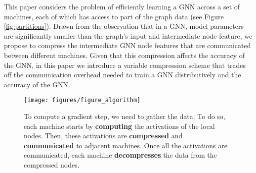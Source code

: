 \documentclass[lettersize,journal]{IEEEtran}
\begin{document}
This paper considers the problem of efficiently learning a GNN across a set of machines, each of which has access to part of the graph data (see Figure \ref{fig:partitions}). Drawn from the observation that in a GNN, model parameters are significantly smaller than the graph's input and intermediate node feature, we propose to compress the intermediate GNN node features that are communicated between different machines. Given that this compression affects the accuracy of the GNN, in this paper we introduce a variable compression scheme that trades off the communication overhead needed to train a GNN distributively and the accuracy of the GNN. 


\begin{figure*}[t]
	\centering
	\texttt{[image: figures/figure\_algorithm]} 
	\caption{To compute a gradient step, we need to gather the data. To do so, each machine starts by \textbf{computing} the activations of the local nodes. Then, these activations are \textbf{compressed} and \textbf{communicated} to adjacent machines. Once all the activations are communicated, each machine \textbf{decompresses} the data from the compressed nodes.  }
		\label{fig:algorithm}
\end{figure*} 
\end{document}
